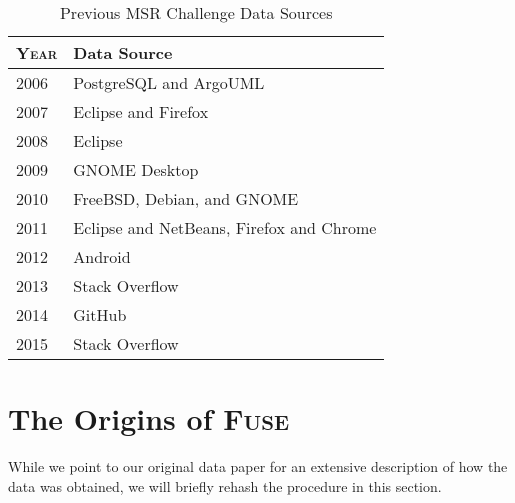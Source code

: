 \documentclass[conference]{IEEEtran}
\begin{document}

\begin{table}[!t]
\caption{Previous MSR Challenge Data Sources\label{tab:datasources}}
\centering
\begin{tabular}{ll}
\toprule
\textbf{\textsc{Year}} & \textbf{Data Source}\\
\midrule
2006 & PostgreSQL and ArgoUML\\
2007 & Eclipse and Firefox\\
2008 & Eclipse\\
2009 & GNOME Desktop\\
2010 & FreeBSD, Debian, and GNOME\\
2011 & Eclipse and NetBeans, Firefox and Chrome\\
2012 & Android\\
2013 & Stack Overflow\\
2014 & GitHub\\
2015 & Stack Overflow\\
\bottomrule
\end{tabular}
\end{table}



\section{The Origins of \textsc{Fuse}}

While we point to our original data paper for an extensive description of how the data was obtained, we will briefly rehash the procedure in this section.
\end{document}
